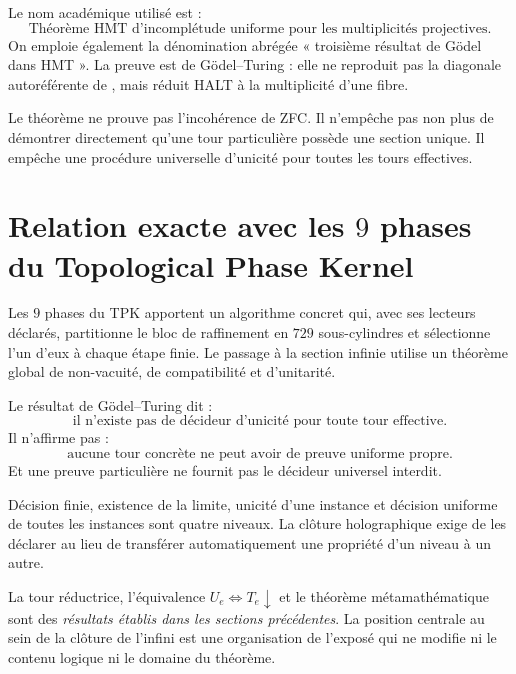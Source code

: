 Le nom académique utilisé est :
\[
\boxed{\text{Théorème HMT d'incomplétude uniforme pour les multiplicités projectives}.}
\]
On emploie également la dénomination abrégée « troisième résultat de Gödel dans
HMT ». La preuve
est de Gödel--Turing : elle ne reproduit pas la diagonale autoréférente de
\cite{goedel1931}, mais réduit HALT à la multiplicité d'une fibre.

\begin{remark}
Le théorème ne prouve pas l'incohérence de ZFC. Il n'empêche pas non plus de démontrer
directement qu'une tour particulière possède une section unique. Il empêche une
procédure universelle d'unicité pour toutes les tours effectives.
\end{remark}

\section{Relation exacte avec les \(9\) phases du Topological Phase Kernel}

Les \(9\) phases du TPK apportent un algorithme concret qui, avec ses lecteurs déclarés,
partitionne le bloc de raffinement en \(729\) sous-cylindres et sélectionne l'un d'eux
à chaque étape finie.
Le passage à la section infinie utilise un théorème global de non-vacuité,
de compatibilité et d'unitarité.

Le résultat de Gödel--Turing dit :
\[
\text{il n'existe pas de décideur d'unicité pour toute tour effective}.
\]
Il n'affirme pas :
\[
\text{aucune tour concrète ne peut avoir de preuve uniforme propre}.
\]
Et une preuve particulière ne fournit pas le décideur universel interdit.


\begin{remark}
Décision finie, existence de la limite, unicité d'une instance et décision
uniforme de toutes les instances sont quatre niveaux. La clôture holographique
exige de les déclarer au lieu de transférer automatiquement une propriété d'un
niveau à un autre.
\end{remark}

\begin{remark}
La tour réductrice, l'équivalence \(U_e\iff T_e\downarrow\) et le théorème
métamathématique sont des \emph{résultats établis dans les sections précédentes}. La position centrale au sein
de la clôture de l'infini est une organisation de l'exposé qui ne modifie ni le contenu logique ni le domaine du théorème.
\end{remark}
